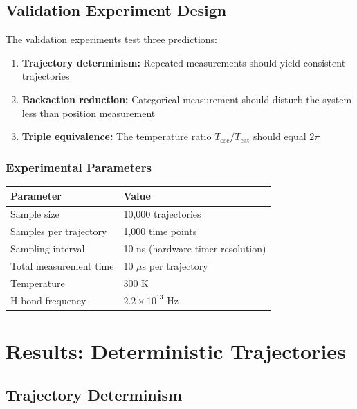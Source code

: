 \documentclass[twocolumn,10pt]{article}
\theoremstyle{remark}
\begin{document}
\subsection{Validation Experiment Design}

The validation experiments test three predictions:
\begin{enumerate}
\item \textbf{Trajectory determinism:} Repeated measurements should yield consistent trajectories
\item \textbf{Backaction reduction:} Categorical measurement should disturb the system less than position measurement
\item \textbf{Triple equivalence:} The temperature ratio $T_{\mathrm{osc}}/T_{\mathrm{cat}}$ should equal $2\pi$
\end{enumerate}

\subsubsection{Experimental Parameters}

\begin{center}
\begin{tabular}{ll}
\toprule
Parameter & Value \\
\midrule
Sample size & 10,000 trajectories \\
Samples per trajectory & 1,000 time points \\
Sampling interval & 10 ns (hardware timer resolution) \\
Total measurement time & 10 $\mu$s per trajectory \\
Temperature & 300 K \\
H-bond frequency & $2.2 \times 10^{13}$ Hz \\
\bottomrule
\end{tabular}
\end{center}

\section{Results: Deterministic Trajectories}

\subsection{Trajectory Determinism}
\end{document}
